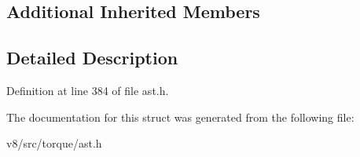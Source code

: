 \subsection*{Additional Inherited Members}


\subsection{Detailed Description}


Definition at line 384 of file ast.\+h.



The documentation for this struct was generated from the following file\+:\begin{DoxyCompactItemize}
\item 
v8/src/torque/ast.\+h\end{DoxyCompactItemize}

